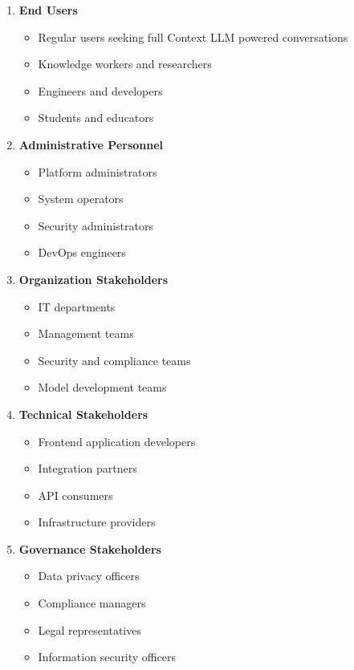 \begin{enumerate}
   \item \textbf{End Users}
   \begin{itemize}
      \item Regular users seeking full Context LLM powered conversations
      \item Knowledge workers and researchers
      \item Engineers and developers
      \item Students and educators
   \end{itemize}

   \item \textbf{Administrative Personnel}
   \begin{itemize}
      \item Platform administrators
      \item System operators
      \item Security administrators
      \item DevOps engineers
   \end{itemize}

   \item \textbf{Organization Stakeholders}
   \begin{itemize}
      \item IT departments
      \item Management teams
      \item Security and compliance teams
      \item Model development teams
   \end{itemize}

   \item \textbf{Technical Stakeholders}
   \begin{itemize}
      \item Frontend application developers
      \item Integration partners
      \item API consumers
      \item Infrastructure providers
   \end{itemize}

   \item \textbf{Governance Stakeholders}
   \begin{itemize}
      \item Data privacy officers
      \item Compliance managers
      \item Legal representatives
      \item Information security officers
   \end{itemize}
\end{enumerate}

